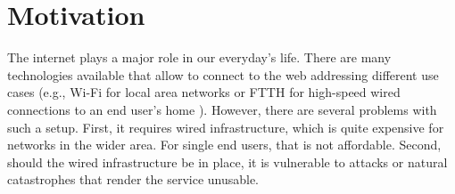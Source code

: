 \section{Motivation} \label{sec:motivation}

%
%

The internet plays a major role in our everyday's life. There are many technologies available that allow to connect to the web addressing different use cases (e.g., Wi-Fi for local area networks \cite{Henry2002} or \ac{FTTH} for high-speed wired connections to an end user's home \cite{Aleksic2010}).
However, there are several problems with such a setup. First, it requires wired infrastructure, which is quite expensive for networks in the wider area. For single end users, that is not affordable. Second, should the wired infrastructure be in place, it is vulnerable to attacks or natural catastrophes that render the service unusable.

